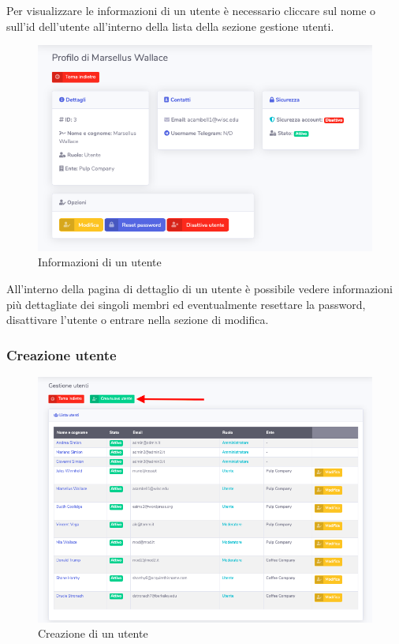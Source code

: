 		Per visualizzare le informazioni di un utente è necessario cliccare sul nome o sull'id dell'utente all'interno della lista della sezione gestione utenti.
		\begin{figure}[H]
		\centering
		\includegraphics[scale=0.600]{res/images/admin/dettUtente.png}
		\caption{Informazioni di un utente}
	\end{figure}
		All'interno della pagina di dettaglio di un utente è possibile vedere informazioni più dettagliate dei singoli membri ed eventualmente resettare la password, disattivare l'utente o entrare nella sezione di modifica.

	\subsubsection{Creazione utente}

		\begin{figure}[H]
		\centering
		\includegraphics[scale=0.600]{res/images/admin/selCreazUtente.png}
		\caption{Creazione di un utente}
	\end{figure}

